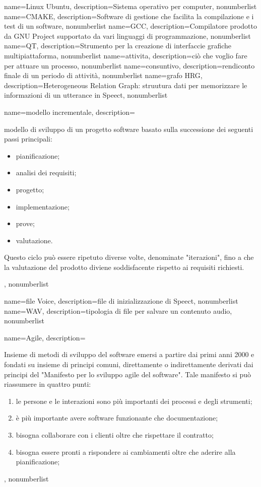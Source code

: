 {
	name={Linux Ubuntu},
	description={Sistema operativo per computer},
	nonumberlist
}
{
	name={CMAKE},
	description={Software di gestione che facilita la compilazione e i test di un software},
	nonumberlist
}
{
	name={GCC},
	description={Compilatore prodotto da GNU Project supportato da vari linguaggi di programmazione},
	nonumberlist
}
{
	name={QT},
	description={Strumento per la creazione di interfaccie grafiche multipiattaforma},
	nonumberlist
}
{
	name={attivita},
	description={ciò che voglio fare per attuare un processo},
	nonumberlist
}
{
	name={consuntivo},
	description={rendiconto finale di un periodo di attività},
	nonumberlist
}
{
	name={grafo HRG},
	description={Heterogeneous Relation Graph: struutura dati per memorizzare le informazioni di un utterance in Speect},
	nonumberlist
}
{
	name={modello incrementale},
	description={modello di sviluppo di un progetto software basato sulla successione dei seguenti passi principali:
	\begin{itemize}
    	\item pianificazione;
    	\item analisi dei requisiti;
   		\item progetto;
   		\item implementazione;
   		\item prove;
   		\item valutazione.
	\end{itemize}
	Questo ciclo può essere ripetuto diverse volte, denominate "iterazioni", fino a che la valutazione del prodotto diviene soddisfacente rispetto ai requisiti richiesti.},
	nonumberlist
}
{
	name={file Voice},
	description={file di inizializzazione di Speect},
	nonumberlist
}
{
	name={WAV},
	description={tipologia di file per salvare un contenuto audio},
	nonumberlist
}
{
	name={Agile},
	description={Insieme di metodi di sviluppo del software emersi a partire dai
		primi anni 2000 e fondati su insieme di principi comuni, direttamente o
		indirettamente derivati dai principi del "Manifesto per lo sviluppo agile del
		software". Tale manifesto si può riassumere in quattro punti:
		\begin{enumerate}
			\item le persone e le interazioni sono più importanti dei processi e degli strumenti;
			\item è più importante avere software funzionante che documentazione;
			\item bisogna collaborare con i clienti oltre che rispettare il contratto;
			\item bisogna essere pronti a rispondere ai cambiamenti oltre che aderire alla pianificazione;
		\end{enumerate}
	},
	nonumberlist
}
